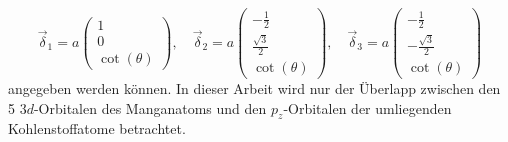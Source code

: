 \begin{equation*}
    \vec{\delta}_1 = a \begin{pmatrix} 1            \\[4pt] 0                   \\[4pt] \cot (\theta)\end{pmatrix}, \quad
    \vec{\delta}_2 = a \begin{pmatrix} -\frac{1}{2} \\[4pt] \frac{\sqrt{3}}{2}  \\[4pt] \cot (\theta)\end{pmatrix}, \quad 
    \vec{\delta}_3 = a \begin{pmatrix} -\frac{1}{2} \\[4pt] -\frac{\sqrt{3}}{2} \\[4pt] \cot (\theta)\end{pmatrix}
\end{equation*}
angegeben werden können. 
In dieser Arbeit wird nur der Überlapp zwischen den 5 $3d$-Orbitalen des Manganatoms und den $p_z$-Orbitalen der umliegenden Kohlenstoffatome betrachtet.